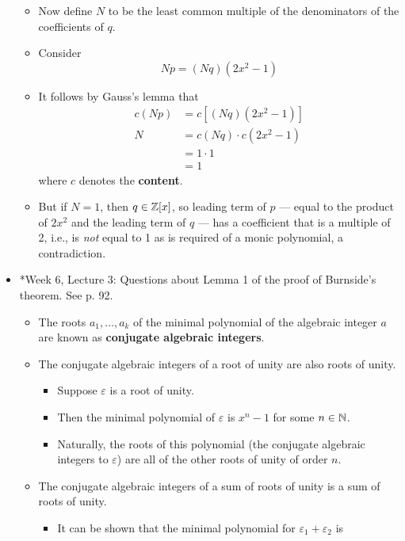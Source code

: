\documentclass[../notes.tex]{subfiles}
\begin{document}
\begin{itemize}
\begin{itemize}
        \item Now define $N$ to be the least common multiple of the denominators of the coefficients of $q$.
        \item Consider
        \begin{equation*}
            Np = (Nq)(2x^2-1)
        \end{equation*}
        \item It follows by Gauss's lemma that
        \begin{align*}
            c(Np) &= c[(Nq)(2x^2-1)]\\
            N &= c(Nq)\cdot c(2x^2-1)\\
            &= 1\cdot 1\\
            &= 1
        \end{align*}
        where $c$ denotes the \textbf{content}.
        \item But if $N=1$, then $q\in\mathbb{Z}[x]$, so leading term of $p$ --- equal to the product of $2x^2$ and the leading term of $q$ --- has a coefficient that is a multiple of 2, i.e., is \emph{not} equal to 1 as is required of a monic polynomial, a contradiction.
    \end{itemize}
    \item *Week 6, Lecture 3: Questions about Lemma 1 of the proof of Burnside's theorem. See p. 92.
    \begin{itemize}
        \item The roots $a_1,\dots,a_k$ of the minimal polynomial of the algebraic integer $a$ are known as \textbf{conjugate algebraic integers}.
        \item The conjugate algebraic integers of a root of unity are also roots of unity.
        \begin{itemize}
            \item Suppose $\varepsilon$ is a root of unity.
            \item Then the minimal polynomial of $\varepsilon$ is $x^n-1$ for some $n\in\mathbb{N}$.
            \item Naturally, the roots of this polynomial (the conjugate algebraic integers to $\varepsilon$) are all of the other roots of unity of order $n$.
        \end{itemize}
        \item The conjugate algebraic integers of a sum of roots of unity is a sum of roots of unity.
        \begin{itemize}
            \item It can be shown that the minimal polynomial for $\varepsilon_1+\varepsilon_2$ is

\end{itemize}
\end{itemize}
\end{itemize}
\end{document}
